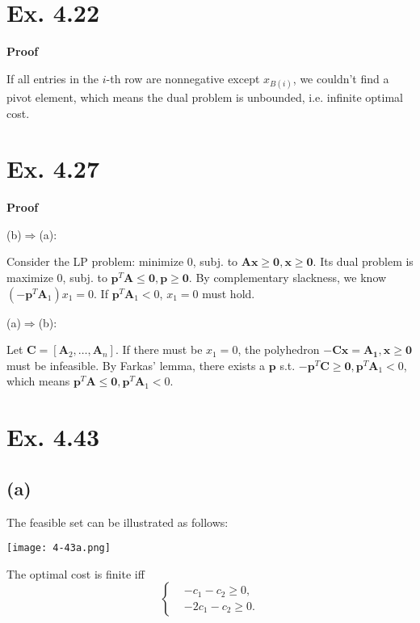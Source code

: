 \documentclass[12pt]{article}
\begin{document}
\section*{Ex. 4.22}
\textbf{Proof}

If all entries in the $i$-th row are nonnegative except $x_{B(i)}$, we couldn't find a pivot element, which means the dual problem is unbounded, i.e. infinite optimal cost.

\section*{Ex. 4.27}
\textbf{Proof}

(b)$\Rightarrow$(a):

Consider the LP problem: minimize 0, subj. to $\bm{Ax}\ge\bm{0},\bm{x}\ge\bm{0}.$ Its dual problem is maximize 0, subj. to $\bm{p}^T\bm{A}\le\bm{0},\bm{p}\ge\bm{0}.$ By complementary slackness, we know $(-\bm{p}^T\bm{A}_1)x_1=0$. If $\bm{p}^T\bm{A}_1<0$, $x_1=0$ must hold.

(a)$\Rightarrow$(b):

Let $\bm{C}=[\bm{A}_2, \ldots, \bm{A}_n]$. If there must be $x_1=0$, the polyhedron $-\bm{C}\bm{x}=\bm{A_1},\bm{x}\ge\bm{0}$ must be infeasible. By Farkas' lemma, there exists a $\bm{p}$ s.t. $-\bm{p}^T\bm{C}\ge\bm{0},\bm{p}^T\bm{A}_1<0$, which means $\bm{p}^T\bm{A}\le\bm{0},\bm{p}^T\bm{A}_1<0.$

\section*{Ex. 4.43}
\subsection*{(a)}
The feasible set can be illustrated as follows:

\centerline{\texttt{[image: 4-43a.png]}}

The optimal cost is finite iff
$$\left\{\begin{aligned}
    &-c_1-c_2\ge 0,\\
    &-2c_1-c_2\ge 0.
\end{aligned}\right.$$
\end{document}
